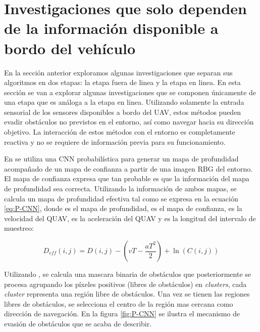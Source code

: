 \section{Investigaciones que solo dependen de la información disponible a bordo del vehículo}

\label{sec::prev-local}

En la sección anterior exploramos algunas investigaciones que separan sus algoritmos en dos etapas: la etapa fuera de linea y la etapa en linea. En esta sección se van a explorar algunas investigaciones que se componen únicamente de una etapa que es análoga a la etapa en linea. Utilizando solamente la entrada sensorial de los sensores disponibles a bordo del UAV, estos métodos pueden evadir obstáculos no previstos en el entorno, así como navegar hacia su dirección objetivo. La interacción de estos métodos con el entorno es completamente reactiva y no se requiere de información previa para su funcionamiento.

En \cite{Yang2021} se utiliza una CNN probabilística para generar un mapa de profundidad acompañado de un mapa de confianza a partir de una imagen RBG del entorno. El mapa de confianza expresa que tan probable es que la información del mapa de profundidad sea correcta. Utilizando la información de ambos mapas, se calcula un mapa de profundidad efectiva tal como se expresa en la ecuación \ref{eq:P-CNN}, donde  es el mapa de profundidad,  es el mapa de confianza,  es la velocidad del QUAV,  es la aceleración del QUAV y  es la longitud del intervalo de muestreo:

\begin{equation}
\label{eq:P-CNN}
    D_{eff}(i,j) = D(i,j) - (vT - \frac{aT^2}{2}) + \ln{(C(i,j))}
\end{equation}

Utilizando , se calcula una mascara binaria de obstáculos  que posteriormente se procesa agrupando los píxeles positivos (libres de obstáculos) en \textit{clusters}, cada \textit{cluster} representa una región libre de obstáculos. Una vez se tienen las regiones libres de obstáculos, se selecciona el centro de la región mas cercana como dirección de navegación. En la figura \ref{fig:P-CNN} se ilustra el mecanismo de evasión de obstáculos que se acaba de describir.

